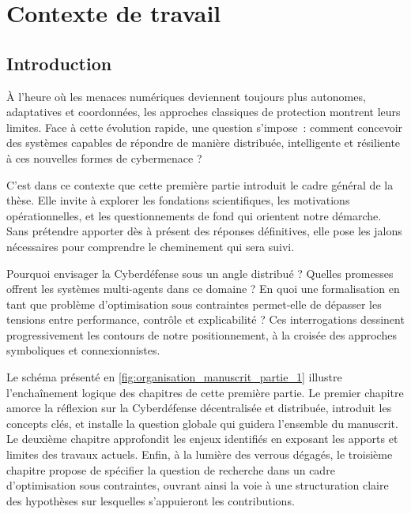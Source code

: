 \clearpage
\thispagestyle{empty}
\null
\newpage

\cleardoublepage
{}
\part{Contexte de travail}
\label{part:contexte}

\clearpage
\thispagestyle{empty}
\null
\newpage

\chapter*{Introduction}

\noindent
À l’heure où les menaces numériques deviennent toujours plus autonomes, adaptatives et coordonnées, les approches classiques de protection montrent leurs limites. Face à cette évolution rapide, une question s’impose~: comment concevoir des systèmes capables de répondre de manière distribuée, intelligente et résiliente à ces nouvelles formes de cybermenace ?

\medskip

\noindent
C’est dans ce contexte que cette première partie introduit le cadre général de la thèse. Elle invite à explorer les fondations scientifiques, les motivations opérationnelles, et les questionnements de fond qui orientent notre démarche. Sans prétendre apporter dès à présent des réponses définitives, elle pose les jalons nécessaires pour comprendre le cheminement qui sera suivi.

\medskip

\noindent
Pourquoi envisager la Cyberdéfense sous un angle distribué ? Quelles promesses offrent les systèmes multi-agents dans ce domaine ? En quoi une formalisation en tant que problème d’optimisation sous contraintes permet-elle de dépasser les tensions entre performance, contrôle et explicabilité ? Ces interrogations dessinent progressivement les contours de notre positionnement, à la croisée des approches symboliques et connexionnistes.

\medskip

\noindent
Le schéma présenté en \autoref{fig:organisation_manuscrit_partie_1} illustre l’enchaînement logique des chapitres de cette première partie. Le premier chapitre amorce la réflexion sur la Cyberdéfense décentralisée et distribuée, introduit les concepts clés, et installe la question globale qui guidera l’ensemble du manuscrit. Le deuxième chapitre approfondit les enjeux identifiés en exposant les apports et limites des travaux actuels. Enfin, à la lumière des verrous dégagés, le troisième chapitre propose de spécifier la question de recherche dans un cadre d’optimisation sous contraintes, ouvrant ainsi la voie à une structuration claire des hypothèses sur lesquelles s’appuieront les contributions.

